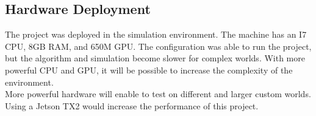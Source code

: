 \documentclass[10pt,journal,compsoc]{IEEEtran}
\begin{document}
\subsection{Hardware Deployment}
The project was deployed in the simulation environment. The machine has an I7 CPU, 8GB RAM, and 650M GPU. The configuration was able to run the project, but the algorithm and simulation become slower for complex worlds. With more powerful CPU and GPU, it will be possible to increase the complexity of the environment.\\
More powerful hardware will enable to test on different and larger custom worlds. Using a Jetson TX2 would increase the performance of this project.



\end{document}
